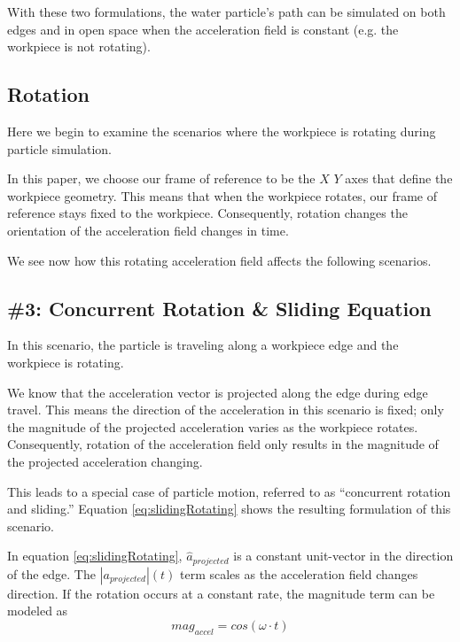 
With these two formulations, the water particle's path can be simulated on both edges and in open space when the acceleration field is constant (e.g. the workpiece is not rotating).

		\subsection{Rotation}

Here we begin to examine the scenarios where the workpiece is rotating during particle simulation.

In this paper, we choose our frame of reference to be the $X$ $Y$ axes that define the workpiece geometry. This means that when the workpiece rotates, our frame of reference stays fixed to the workpiece. Consequently, rotation changes the orientation of the acceleration field changes in time.

We see now how this rotating acceleration field affects the following scenarios.

		\subsection{\#3: Concurrent Rotation \& Sliding Equation}

In this scenario, the particle is traveling along a workpiece edge and the workpiece is rotating.

We know that the acceleration vector is projected along the edge during edge travel. This means the direction of the acceleration in this scenario is fixed; only the magnitude of the projected acceleration varies as the workpiece rotates. Consequently, rotation of the acceleration field only results in the magnitude of the projected acceleration changing.

This leads to a special case of particle motion, referred to as ``concurrent rotation and sliding.'' Equation \eqref{eq:slidingRotating} shows the resulting formulation of this scenario.

 {
	\label{eq:slidingRotating}
}

In equation \eqref{eq:slidingRotating}, $\hat{a}_{projected}$ is a constant unit-vector in the direction of the edge. The $|a_{projected}|(t)$ term scales as the acceleration field changes direction. If the rotation occurs at a constant rate, the magnitude term can be modeled as
$$
mag_{accel} = cos(\omega \cdot t)
$$

